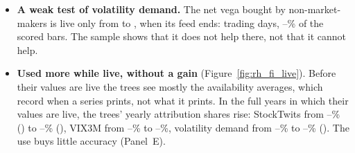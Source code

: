 \begin{itemize}
  enter as zero until the rolling window holds \rhorWindowDays{} trading days of their history
  (Section~\ref{sec:rh_predictors}), so over most of the span Panels~A and~B measure them through their availability
  shares. On the bars on which their values are live the gains remain small:
  \begin{itemize}
  \item Adding the VIX changes the loss of XGBoost by \rhabXgbAddIvLiveIvPct\% from \rhabLiveIvStart{}
    ($\DM={}$\rhabXgbAddIvLiveIvDm).
  \item The StockTwits series change no class's loss significantly from \rhabLiveSentStart{} (the largest change is
    the elastic net's, \rhabEnetAddSentLiveSentPct\%).
  \item The volatility-demand series raise the loss of the penalized linear models between \rhabLiveVdStart{} and
    \rhabLiveVdEnd{} (\rhabRidgeAddVdLiveVdPct\% for ridge regression, $\DM={}$\rhabRidgeAddVdLiveVdDm).
  \end{itemize}
\item \textbf{A weak test of volatility demand.} The net vega bought by non-market-makers is live only from
  \rhabLiveVdStart{} to \rhabLiveVdEnd, when its feed ends: \rhabLiveVdDays{} trading days,
  \rhlvVdEvLo--\rhlvVdEvHi\% of the scored bars. The sample shows that it does not help there, not that it cannot
  help.
\item \textbf{Used more while live, without a gain} (Figure~\ref{fig:rh_fi_live}). Before their values are live the
  trees see mostly the availability averages, which record when a series prints, not what it prints. In the full
  years in which their values are live, the trees' yearly attribution shares rise: StockTwits from
  \rhfilStwPreMin--\rhfilStwPreMax\% (\rhfilStwPreYears) to \rhfilStwLiveMin--\rhfilStwLiveMax\%
  (\rhfilStwLiveYears), VIX3M from \rhfilVixThreePreMin--\rhfilVixThreePreMax\% to
  \rhfilVixThreeLiveMin--\rhfilVixThreeLiveMax\%, volatility demand from \rhfilVdPreMin--\rhfilVdPreMax\% to
  \rhfilVdLiveMin--\rhfilVdLiveMax\% (\rhfilVdLiveYears). The use buys little accuracy (Panel~E).
\end{itemize}


